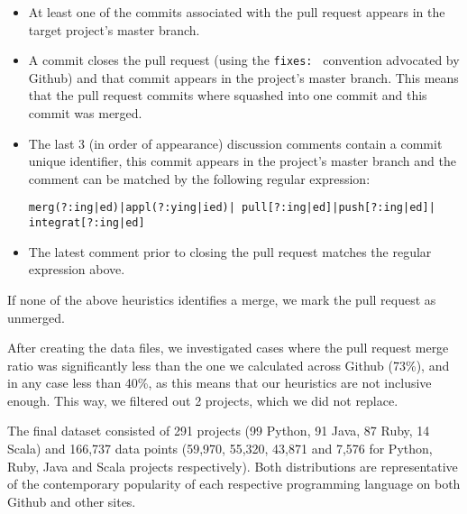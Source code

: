 \documentclass{sig-alternate}
\begin{document}
\begin{itemize}

  \item At least one of the commits associated with the pull request appears in
    the target project's master branch. 

  \item A commit closes the pull request (using the \texttt{fixes: } convention
    advocated by Github) and that commit appears in the project's master branch.
    This means that the pull request commits where squashed into one commit and
    this commit was merged.

  \item The last 3 (in order of appearance) discussion comments contain
    a commit unique identifier, this commit appears in the
    project's master branch and the comment can be matched by the following 
    regular expression:

    \texttt{merg(?:ing|ed)|appl(?:ying|ied)|\-
            pull[?:ing|ed]|push[?:ing|ed]|\-
            integrat[?:ing|ed]}

  \item The latest comment prior to closing the pull request matches the 
    regular expression above.

\end{itemize}

If none of the above heuristics identifies a merge, we mark the pull request
as unmerged. 

After creating the data files, we investigated cases where the pull request
merge ratio was significantly less than the one we calculated across Github
(73\%), and in any case less than 40\%, as this means that our heuristics are not
inclusive enough. This way, we filtered out 2 projects, which we did not
replace.

The final dataset consisted of 291 projects (99 Python, 91 Java, 87 Ruby, 14
Scala) and 166,737 data points (59,970, 55,320, 43,871 and 7,576 for Python,
Ruby, Java and Scala projects respectively). Both distributions are
representative of the contemporary popularity of each respective programming
language on both Github and other sites.

%
\end{document}
